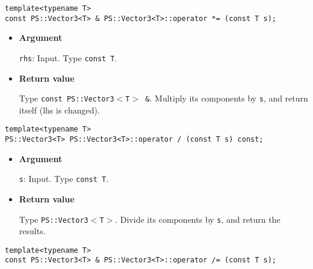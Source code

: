 \begin{screen}
\begin{verbatim}
template<typename T>
const PS::Vector3<T> & PS::Vector3<T>::operator *= (const T s);
\end{verbatim}
\end{screen}

\begin{itemize}

\item{{\bf Argument}}

\texttt{rhs}: Input. Type \texttt{const T}.

\item{{\bf Return value}}

Type \texttt{const PS::Vector3$<$T$>$ \&}. Multiply its components by \texttt{s},
and return itself (lhs is changed).

\end{itemize}


\begin{screen}
\begin{verbatim}
template<typename T>
PS::Vector3<T> PS::Vector3<T>::operator / (const T s) const;
\end{verbatim}
\end{screen}

\begin{itemize}

\item{{\bf Argument}}

\texttt{s}: Input. Type \texttt{const T}.

\item{{\bf Return value}}

Type \texttt{PS::Vector3$<$T$>$}. Divide its components by \texttt{s}, and return
the results.

\end{itemize}


\begin{screen}
\begin{verbatim}
template<typename T>
const PS::Vector3<T> & PS::Vector3<T>::operator /= (const T s);
\end{verbatim}
\end{screen}

